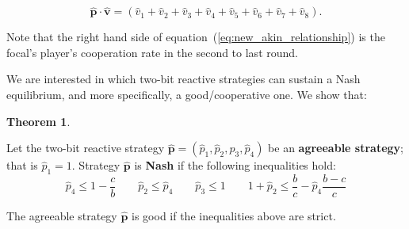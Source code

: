 \documentclass{article}
\theoremstyle{definition}
\newtheorem{theorem}{Theorem}[section]
\begin{document}
\begin{equation}\label{eq:new_akin_relationship}
  \mathbf{\hat{p}} \cdot \mathbf{\hat{v}} = (\hat{v}_1 + \hat{v}_2 + \hat{v}_3 + \hat{v}_4 + \hat{v}_5 + \hat{v}_6 + \hat{v}_7 + \hat{v}_8).
\end{equation}

Note that the right hand side of equation~(\ref{eq:new_akin_relationship}) is
the focal's player's cooperation rate in the second to last round.

We are interested in which two-bit reactive strategies can sustain a Nash
equilibrium, and more specifically, a good/cooperative one. We show that:

\begin{theorem}\label{theorem:two_bit_nash_and_good}

  Let the two-bit reactive strategy \(\mathbf{\hat{p}} = (\hat{p}_{1}, \hat{p}_{2}, \hat{p}_{3}, \hat{p}_{4})\) be an \textbf{agreeable
  strategy}; that is \(\hat{p}_1 = 1\). Strategy \(\mathbf{\hat{p}}\) is \textbf{Nash} if the
  following inequalities hold:
  \begin{equation*}
      \hat{p}_4 \leq 1 - \frac{c}{b} \qquad  \hat{p}_2  \leq \hat{p}_4 \qquad \hat{p}_3 \leq 1 \qquad 1 + \hat{p}_2 \leq \frac{b}{c} - \hat{p}_4 \frac{b - c}{c}
  \end{equation*}
  
  The agreeable strategy \(\mathbf{\hat{p}}\) is good if the inequalities above are strict.
  \end{theorem}
  
\end{document}
